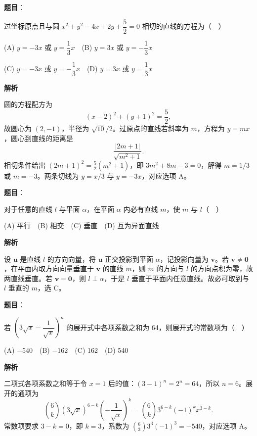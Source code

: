 \begin{answer}

\textbf{题目}：

过坐标原点且与圆 \(x^2+y^2-4x+2y+\dfrac52=0\) 相切的直线的方程为（　）

(A) \(y=-3x\) 或 \(y=\dfrac13x\)　(B) \(y=3x\) 或 \(y=-\dfrac13x\)

(C) \(y=-3x\) 或 \(y=-\dfrac13x\)　(D) \(y=3x\) 或 \(y=\dfrac13x\)

\textbf{解析}

圆的方程配方为
\nopagebreak[4]
\[
(x-2)^2+(y+1)^2=\frac52,
\]
故圆心为 \((2,-1)\)，半径为 \(\sqrt{10}/2\)。过原点的直线若斜率为 \(m\)，方程为 \(y=mx\)，圆心到直线的距离是
\nopagebreak[4]
\[
\frac{|2m+1|}{\sqrt{m^2+1}}.
\]
相切条件给出 \((2m+1)^2=\tfrac52(m^2+1)\)，即 \(3m^2+8m-3=0\)，解得 \(m=1/3\) 或 \(m=-3\)。两条切线为 \(y=x/3\) 与 \(y=-3x\)，对应选项 A。


\end{answer}
\begin{answer}

\textbf{题目}：

对于任意的直线 \(l\) 与平面 \(\alpha\)，在平面 \(\alpha\) 内必有直线 \(m\)，使 \(m\) 与 \(l\)（　）

(A) 平行　(B) 相交　(C) 垂直　(D) 互为异面直线

\textbf{解析}

设 \(\boldsymbol u\) 是直线 \(l\) 的方向向量，将 \(\boldsymbol u\) 正交投影到平面 \(\alpha\)，记投影向量为 \(\boldsymbol v\)。若 \(\boldsymbol v\ne\boldsymbol0\)，在平面内取方向向量垂直于 \(\boldsymbol v\) 的直线 \(m\)，则 \(m\) 的方向与 \(l\) 的方向点积为零，故两直线垂直。若 \(\boldsymbol v=\boldsymbol0\)，则 \(l\perp\alpha\)，于是 \(l\) 垂直于平面内任意直线。故必可取到与 \(l\) 垂直的 \(m\)，选 C。


\end{answer}
\begin{answer}

\textbf{题目}：

若 \(\left(3\sqrt{x}-\dfrac1{\sqrt{x}}\right)^n\) 的展开式中各项系数之和为 64，则展开式的常数项为（　）

(A) \(-540\)　(B) \(-162\)　(C) 162　(D) 540

\textbf{解析}

二项式各项系数之和等于令 \(x=1\) 后的值：\((3-1)^n=2^n=64\)，所以 \(n=6\)。展开的通项为
\nopagebreak[4]
\[
\binom 6k(3\sqrt{x})^{6-k}\left(-\frac1{\sqrt{x}}\right)^k
=\binom 6k3^{6-k}(-1)^k x^{3-k}.
\]
常数项要求 \(3-k=0\)，即 \(k=3\)，系数为 \(\binom63 3^3(-1)^3=-540\)，对应选项 A。


\end{answer}
